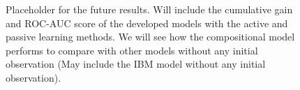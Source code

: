 \begin{figure}[t]
	\centering
	
	\caption{Placeholder for the future results. Will include the cumulative gain and ROC-AUC score of the developed models with the active and passive learning methods. We will see how the compositional model performs to compare with other models without any initial observation (May include the IBM model without any initial observation).}
\end{figure}

